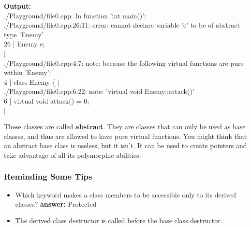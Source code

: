 \documentclass[12pt , a4paper]{article}
\begin{document}
	\begin{tcolorbox}
	\textbf{Output:}\\
	./Playground/file0.cpp: In function 'int main()':\\
	./Playground/file0.cpp:26:11: error: cannot declare variable 'e' to be of abstract type 'Enemy'\\
	   26 |     Enemy e;\\
	      | \\       
	./Playground/file0.cpp:4:7: note:   because the following virtual functions are pure within 'Enemy':\\
	    4 | class Enemy \{
	      |    \\
	./Playground/file0.cpp:6:22: note:     'virtual void Enemy::attack()'\\
	    6 |         virtual void attack() = 0;\\
	      |     
	\end{tcolorbox}
	These classes are called \textbf{abstract}. They are classes that can only be used as base classes, and thus are allowed to have pure virtual functions.
	You might think that an abstract base class is useless, but it isn't. It can be used to create pointers and take advantage of all its polymorphic abilities.\\
	\subsubsection{Reminding Some Tips}

	\begin{importantBox}

		\begin{itemize}
			\item Which keyword makes a class members to be accessible only to its derived classes? \textbf{answer:} Protected \\
			\item The derived class destructor is called before the base class destructor.
		\end{itemize}
	\end{importantBox}
%
%
\end{document}
